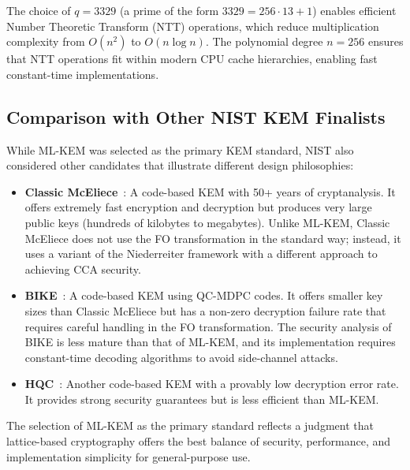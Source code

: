 The choice of $q = 3329$ (a prime of the form $3329 = 256 \cdot 13 + 1$) enables efficient Number Theoretic Transform (NTT) operations, which reduce multiplication complexity from $O(n^2)$ to $O(n \log n)$. The polynomial degree $n = 256$ ensures that NTT operations fit within modern CPU cache hierarchies, enabling fast constant-time implementations.

\subsection{Comparison with Other NIST KEM Finalists}

While ML-KEM was selected as the primary KEM standard, NIST also considered other candidates that illustrate different design philosophies:

\begin{itemize}
    \item \textbf{Classic McEliece}~\cite{bernstein2017classic}: A code-based KEM with 50+ years of cryptanalysis. It offers extremely fast encryption and decryption but produces very large public keys (hundreds of kilobytes to megabytes). Unlike ML-KEM, Classic McEliece does not use the FO transformation in the standard way; instead, it uses a variant of the Niederreiter framework with a different approach to achieving CCA security.

    \item \textbf{BIKE}~\cite{aragon2022bike}: A code-based KEM using QC-MDPC codes. It offers smaller key sizes than Classic McEliece but has a non-zero decryption failure rate that requires careful handling in the FO transformation. The security analysis of BIKE is less mature than that of ML-KEM, and its implementation requires constant-time decoding algorithms to avoid side-channel attacks.

    \item \textbf{HQC}~\cite{melchor2018hamming}: Another code-based KEM with a provably low decryption error rate. It provides strong security guarantees but is less efficient than ML-KEM.
\end{itemize}

The selection of ML-KEM as the primary standard reflects a judgment that lattice-based cryptography offers the best balance of security, performance, and implementation simplicity for general-purpose use.